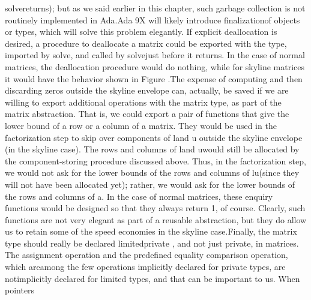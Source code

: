 \tyxffmxmono[]solve\tyxffmxendmono[] returns); but as we said earlier
in this chapter, such garbage collection is not routinely implemented
in Ada.\NtFoot[]\NtNtpar[]Ada 9X will likely introduce \ldquo[]finalization\rdquo[]
of objects or types, which will solve this problem elegantly.%
\NtEndntpar[]\NtEndfoot[] If explicit deallocation is desired, a procedure
to deallocate a matrix could be exported with the type, imported by
\tyxffmxmono[]solve\tyxffmxendmono[], and called by %
\tyxffmxmono[]solve\tyxffmxendmono[] just before it returns. In the
case of normal matrices, the deallocation procedure would do nothing,
while for skyline matrices it would have the behavior shown in Figure
.\Endpara[]
\Para[]The expense of computing and then discarding zeros outside
the skyline envelope can, actually, be saved if we are willing to
export additional operations with the matrix type, as part of the
matrix abstraction. That is, we could export a pair of functions that
give the lower bound of a row or a column of a matrix. They would
be used in the factorization step to skip over components of %
\tyxffmxmono[]l\tyxffmxendmono[] and \tyxffmxmono[]u%
\tyxffmxendmono[] outside the skyline envelope (in the skyline case).
The rows and columns of \tyxffmxmono[]l\tyxffmxendmono[] and %
\tyxffmxmono[]u\tyxffmxendmono[] would still be allocated by the component-storing
procedure discussed above. Thus, in the factorization step, we would
not ask for the lower bounds of the rows and columns of %
\tyxffmxmono[]lu\tyxffmxendmono[] (since they will not have been allocated
yet); rather, we would ask for the lower bounds of the rows and columns
of \tyxffmxmono[]a\tyxffmxendmono[]. In the case of normal matrices,
these enquiry functions would be designed so that they always return
1, of course. Clearly, such functions are not very elegant as part
of a reusable abstraction, but they do allow us to retain some of
the speed economies in the skyline case.\Endpara[]
\Para[]Finally, the matrix type should really be declared %
\tyxffmxmono[]\tyxtstxbf[]limited\tyxtstxendbf[]%
\tyxffmxendmono[] \tyxffmxmono[]\tyxtstxbf[]private%
\tyxtstxendbf[]\tyxffmxendmono[], and not just \tyxffmxmono[]%
\tyxtstxbf[]private\tyxtstxendbf[]\tyxffmxendmono[], in %
\tyxffmxmono[]matrices\tyxffmxendmono[]. The assignment operation
and the predefined equality comparison operation, which %
\txtxemph[]are\txtxendemph[] among the few operations implicitly declared
for private types, are \txtxemph[]not\txtxendemph[] implicitly declared
for limited types, and that can be important to us. When pointers
